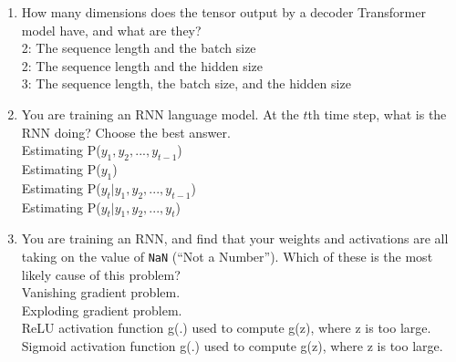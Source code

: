 \begin{enumerate}
    \item How many dimensions does the tensor output by a decoder Transformer model have, and what are they? \\ 
        \hspace{1cm}\choice{} 2: The sequence length and the batch size \\ 
        \hspace{1cm}\choice{} 2: The sequence length and the hidden size \\ 
        \hspace{1cm}\checkmark{}  3: The sequence length, the batch size, and the hidden size \\ 
        \solution{}
    \item You are training an RNN language model. At the $t$th time step, what is the RNN doing? Choose the best answer. \\ 
        \hspace{1cm}\choice{}  Estimating P($y_{1}, y_2, ..., y_{t-1}$) \\ 
        \hspace{1cm}\choice{}  Estimating P($y_1$) \\ 
        \hspace{1cm}\checkmark{}  Estimating P($y_t | y_1, y_2, ..., y_{t-1}$) \\ 
        \hspace{1cm}\choice{}  Estimating P($y_t | y_1, y_2, ..., y_t$) \\ 
    \solution{}
    
    \item You are training an RNN, and find that your weights and activations are all taking on the value of \texttt{NaN} (``Not a Number''). Which of these is the most likely cause of this problem? \\ 
        \hspace{1cm}\choice{} Vanishing gradient problem. \\ 
        \hspace{1cm}\checkmark{} Exploding gradient problem. \\ 
        \hspace{1cm}\choice{} ReLU activation function g(.) used to compute g(z), where z is too large. \\ 
        \hspace{1cm}\choice{} Sigmoid activation function g(.) used to compute g(z), where z is too large. \\ 
        \solution{}


\end{enumerate}

